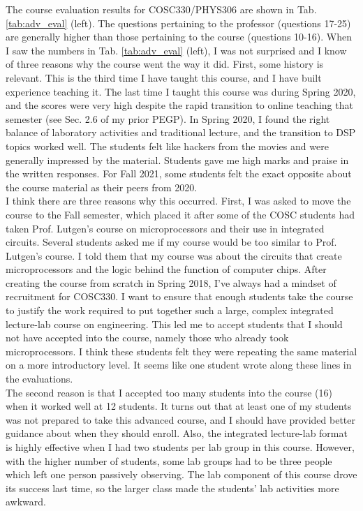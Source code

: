 \documentclass[../../main.tex]{subfiles}
\begin{document}
The course evaluation results for COSC330/PHYS306 are shown in Tab. \ref{tab:adv_eval} (left).  The questions pertaining to the professor (questions 17-25) are generally higher than those pertaining to the course (questions 10-16).  When I saw the numbers in Tab. \ref{tab:adv_eval} (left), I was not surprised and I know of three reasons why the course went the way it did.  First, some history is relevant.  This is the third time I have taught this course, and I have built experience teaching it.  The last time I taught this course was during Spring 2020, and the scores were very high despite the rapid transition to online teaching that semester (see Sec. 2.6 of my prior PEGP).  In Spring 2020, I found the right balance of laboratory activities and traditional lecture, and the transition to DSP topics worked well.  The students felt like hackers from the movies and were generally impressed by the material.  Students gave me high marks and praise in the written responses.  For Fall 2021, some students felt the exact opposite about the course material as their peers from 2020.
\\
\vspace{0.15cm}
I think there are three reasons why this occurred.  First, I was asked to move the course to the Fall semester, which placed it after some of the COSC students had taken Prof. Lutgen's course on microprocessors and their use in integrated circuits.  Several students asked me if my course would be too similar to Prof. Lutgen's course.  I told them that my course was about the circuits that create microprocessors and the logic behind the function of computer chips.  After creating the course from scratch in Spring 2018, I've always had a mindset of recruitment for COSC330.  I want to ensure that enough students take the course to justify the work required to put together such a large, complex integrated lecture-lab course on engineering.  This led me to accept students that I should not have accepted into the course, namely those who already took microprocessors.  I think these students felt they were repeating the same material on a more introductory level.  It seems like one student wrote along these lines in the evaluations.
\\
\vspace{0.15cm}
The second reason is that I accepted too many students into the course (16) when it worked well at 12 students.  It turns out that at least one of my students was not prepared to take this advanced course, and I should have provided better guidance about when they should enroll.  Also, the integrated lecture-lab format is highly effective when I had two students per lab group in this course.  However, with the higher number of students, some lab groups had to be three people which left one person passively observing.  The lab component of this course drove its success last time, so the larger class made the students' lab activities more awkward.
\end{document}
